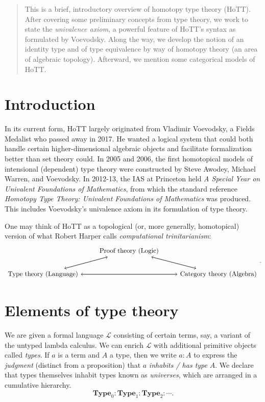 \documentclass[10pt,letterpaper,cm]{nupset}
\theoremstyle{definition}
\theoremstyle{theorem}
\theoremstyle{remark}
\newcommand{\1}{\mathbf{1}}
\newcommand{\0}{\vec 0}
\begin{document}
\thispagestyle{empty}
\begin{abstract}
This is a brief, introductory overview of homotopy type theory (HoTT). After covering some preliminary concepts from type theory, we work to state the \textit{univalence axiom}, a powerful feature of HoTT's syntax as formulated by Voevodsky. Along the way, we develop the notion of an identity type and of type equivalence by way of homotopy theory (an area of algebraic topology). Afterward, we mention some categorical models of HoTT.
\end{abstract}



\tableofcontents
\newpage


\section*{Introduction}

In its current form, HoTT largely originated from Vladimir Voevodsky, a Fields Medalist who passed away in 2017. He wanted a logical system that could both handle certain higher-dimensional algebraic objects and facilitate formalization better than set theory could. In 2005 and 2006, the first homotopical models of intensional (dependent) type theory were constructed by Steve Awodey, Michael Warren, and Voevodsky. In 2012-13,  the IAS at Princeton held \textit{A Special Year on Univalent Foundations of Mathematics}, from which the standard reference \textit{Homotopy Type Theory: Univalent Foundations of Mathematics} was produced. This includes Voevodsky's univalence axiom in its formulation of type theory.

One may think of HoTT as a topological (or, more generally, homotopical) version of what Robert Harper calls \textit{computational trinitarianism}:
\[
\begin{tikzcd}
 & \text{Proof theory (Logic)} \arrow[rd] \arrow[ld] &  \\
\text{Type theory (Language)} \arrow[ru] \arrow[rr] &  & \text{Category theory (Algebra)} \arrow[lu] \arrow[ll]
\end{tikzcd}
.\]

\section{Elements of type theory}

We are given a formal language $\mathcal{L}$ consisting of certain terms, say, a variant of the untyped lambda calculus. We can enrich $\mathcal{L}$ with additional primitive objects called \textit{types}. If $a$ is a term and $A$ a type, then we write $a: A$ to express the \textit{judgment} (distinct from a proposition) that $a$ \textit{inhabits / has type} $A$. We declare that types themselves inhabit types known as \textit{universes}, which are arranged in a cumulative hierarchy. $$\mathbf{Type}_0 :\mathbf{Type}_1 : \mathbf{Type}_2 : \cdots . $$ 
\end{document}
